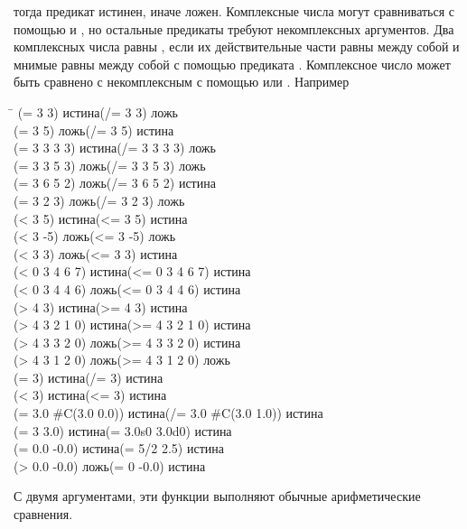\begin{defun}[Функция]
тогда предикат истинен, иначе ложен.
Комплексные числа могут сравниваться с помощью \cdf{=} и \cdf{/=}, но остальные
предикаты требуют некомплексных аргументов.
Два комплексных числа равны \cdf{=}, если их действительные части равны между
собой и мнимые равны между собой с помощью предиката \cdf{=}.
Комплексное число может быть сравнено с некомплексным с помощью \cdf{=} или
\cdf{/=}.
Например
\begin{lisp}
\textwidth\=\kill
(= 3 3) \textrm{истина}\>(/= 3 3) \textrm{ложь} \\
(= 3 5) \textrm{ложь}\>(/= 3 5) \textrm{истина} \\
(= 3 3 3 3) \textrm{истина}\>(/= 3 3 3 3) \textrm{ложь} \\
(= 3 3 5 3) \textrm{ложь}\>(/= 3 3 5 3) \textrm{ложь} \\
(= 3 6 5 2) \textrm{ложь}\>(/= 3 6 5 2) \textrm{истина} \\
(= 3 2 3) \textrm{ложь}\>(/= 3 2 3) \textrm{ложь} \\
(< 3 5) \textrm{истина}\>(<= 3 5) \textrm{истина} \\
(< 3 -5) \textrm{ложь}\>(<= 3 -5) \textrm{ложь} \\
(< 3 3) \textrm{ложь}\>(<= 3 3) \textrm{истина} \\
(< 0 3 4 6 7) \textrm{истина}\>(<= 0 3 4 6 7) \textrm{истина} \\
(< 0 3 4 4 6) \textrm{ложь}\>(<= 0 3 4 4 6) \textrm{истина} \\
(> 4 3) \textrm{истина}\>(>= 4 3) \textrm{истина} \\
(> 4 3 2 1 0) \textrm{истина}\>(>= 4 3 2 1 0) \textrm{истина} \\
(> 4 3 3 2 0) \textrm{ложь}\>(>= 4 3 3 2 0) \textrm{истина} \\
(> 4 3 1 2 0) \textrm{ложь}\>(>= 4 3 1 2 0) \textrm{ложь} \\
(= 3) \textrm{истина}\>(/= 3) \textrm{истина} \\
(< 3) \textrm{истина}\>(<= 3) \textrm{истина} \\
(= 3.0 \#C(3.0 0.0)) \textrm{истина}\>(/= 3.0 \#C(3.0 1.0)) \textrm{истина} \\
(= 3 3.0) \textrm{истина}\>(= 3.0s0 3.0d0) \textrm{истина} \\
(= 0.0 -0.0) \textrm{истина}\>(= 5/2 2.5) \textrm{истина} \\
(> 0.0 -0.0) \textrm{ложь}\>(= 0 -0.0) \textrm{истина}
\end{lisp}
С двумя аргументами, эти функции выполняют обычные арифметические сравнения.

\end{defun}
